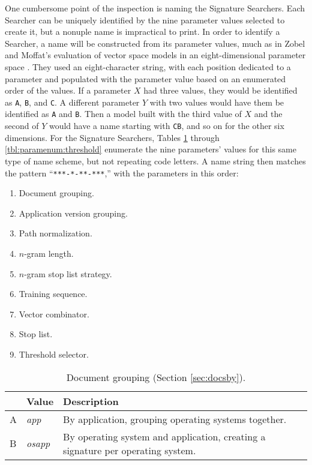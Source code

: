 \documentclass[11pt]{ucthesis}
\theoremstyle{plain}
\theoremstyle{definition}
\begin{document}
One cumbersome point of the inspection is naming the Signature Searchers.  Each Searcher can be uniquely identified by the nine parameter values selected to create it, but a nonuple name is impractical to print.  In order to identify a Searcher, a name will be constructed from its parameter values, much as in Zobel and Moffat's evaluation of vector space models in an eight-dimensional parameter space \cite{zobel:sigir98}.  They used an eight-character string, with each position dedicated to a parameter and populated with the parameter value based on an enumerated order of the values.  If a parameter $X$ had three values, they would be identified as \texttt{A}, \texttt{B}, and \texttt{C}.  A different parameter $Y$ with two values would have them be identified as \texttt{A} and \texttt{B}.  Then a model built with the third value of $X$ and the second of $Y$ would have a name starting with \texttt{CB}, and so on for the other six dimensions.  For the Signature Searchers, Tables \ref{tbl:paramenum:docsby} through \ref{tbl:paramenum:threshold} enumerate the nine parameters' values for this same type of name scheme, but not repeating code letters.  A name string then matches the pattern ``\texttt{***-*-**-***},'' with the parameters in this order:

\begin{enumerate}
\item Document grouping. %
\item Application version grouping.  %
\item Path normalization. %
\item $n$-gram length. %
\item $n$-gram stop list strategy. %
\item Training sequence. %
\item Vector combinator. %
\item Stop list. %
\item Threshold selector. %
\end{enumerate}

\begin{table}[htp]
\begin{small}
\caption{\label{tbl:paramenum:docsby}Document grouping (Section \ref{sec:docsby}).}
\begin{center}
\begin{tabular}{llp{4in}}
\toprule
 & Value & Description \\
\midrule
A & \emph{app} & By application, grouping operating systems together. \\
B & \emph{osapp} & By operating system and application, creating a signature per operating system. \\
\bottomrule
\end{tabular}
\end{center}
\end{small}
\end{table}
\end{document}
